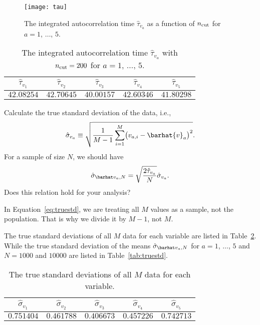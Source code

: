 \begin{figure}[h]
    \centering
    \texttt{[image: tau]}
    \caption{The integrated autocorrelation time \(\hat{\tau}_{v_a}\) as a
        function of \(n_\textnormal{cut}\) for \(a = 1\), \(\ldots\), \(5\).}
    \label{fig:tau}
\end{figure}

\begin{table}
    \centering
    \caption{The integrated autocorrelation time \(\hat{\tau}_{v_a}\) with
        \(n_\textnormal{cut} = 200\) for \(a = 1\), \(\ldots\), \(5\).}
    \label{tab:tau}
    \begin{tabular}{@{}ccccc@{}}
        \toprule
        \(\hat{\tau}_{v_1}\) & \(\hat{\tau}_{v_2}\) & \(\hat{\tau}_{v_3}\) & \(\hat{\tau}_{v_4}\) & \(\hat{\tau}_{v_5}\) \\
        \midrule
        \(42.08254\)         & \(42.70645\)         & \(40.00157\)         & \(42.60346\)         & \(41.80298\)         \\
        \bottomrule
    \end{tabular}
\end{table}

\Question{} Calculate the true standard deviation of the data, i.e.,
%
\begin{equation}\label{eq:truestd}
    \hat{\sigma}_{v_a} \equiv \sqrt{\frac{ 1 }{ M - 1 }
        \sum_{i=1}^M \bigl( v_{a,i} - \barhat{v}_a \bigr)^2}.
\end{equation}
%
For a sample of size \(N\), we should have
%
\begin{equation}\label{eq:relation}
    \sgbar{a} = \sqrt{\frac{ 2 \hat{\tau}_{v_a} }{ N }} \hat{\sigma}_{v_a}.
\end{equation}
%
Does this relation hold for your analysis?

\Answer{}
In Equation~\eqref{eq:truestd}, we are treating all \(M\) values as a sample,
not the population.
That is why we divide it by \(M - 1\), not \(M\).

The true standard deviations of all \(M\) data for each variable are
listed in Table~\ref{tab:std}.
While the true standard deviation of the means
\(\sgbar{a}\) for \(a = 1\), \(\ldots\), \(5\) and \(N = 1000\) and \(10000\) are
listed in Table~\ref{tab:truestd}.

\begin{table}[H]
    \centering
    \caption{The true standard deviations of all \(M\) data for each variable.}
    \label{tab:std}
    \begin{tabular}{@{}ccccc@{}}
        \toprule
        \(\hat{\sigma}_{v_1}\) & \(\hat{\sigma}_{v_2}\) & \(\hat{\sigma}_{v_3}\) & \(\hat{\sigma}_{v_4}\) & \(\hat{\sigma}_{v_5}\) \\
        \midrule
        \(0.751404\)           & \(0.461788\)           & \(0.406673\)           & \(0.457226\)           & \(0.742713\)           \\
        \bottomrule
    \end{tabular}
\end{table}

